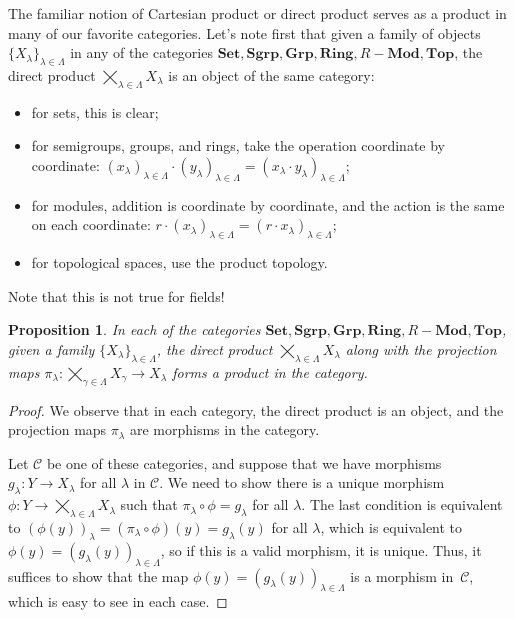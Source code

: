 \documentclass{amsart}[12pt]
\def\sC{\mathscr C}
\numberwithin{equation}{section}
\theoremstyle{plain} %
\newtheorem{prop}[equation]{Proposition}
\theoremstyle{definition}
\theoremstyle{remark}
\newcommand{\Set}{\mathbf{Set}}
\newcommand{\Grp}{\mathbf{Grp}}
\newcommand{\Sgrp}{\mathbf{Sgrp}}
\newcommand{\Ring}{\mathbf{Ring}}
\newcommand{\Mod}[1]{#1-\mathbf{Mod}}
\newcommand{\Top}{\mathbf{Top}}
\begin{document}
The familiar notion of Cartesian product or direct product serves as a product in many of our favorite categories. Let's note first that given a family of objects $\{X_\lambda\}_{\lambda\in \Lambda}$ in any of the categories $\Set,\Sgrp,\Grp,\Ring,\Mod{R},\Top$, the direct product $\bigtimes_{\lambda\in\Lambda} X_\lambda$ is an object of the same category:
\begin{itemize}
\item for sets, this is clear;
\item for semigroups, groups, and rings, take the operation coordinate by coordinate: $(x_{\lambda})_{\lambda\in \Lambda} \cdot (y_\lambda)_{\lambda\in \Lambda} = (x_\lambda \cdot y_\lambda)_{\lambda\in \Lambda}$;
\item for modules, addition is coordinate by coordinate, and the action is the same on each coordinate: $r\cdot (x_\lambda)_{\lambda\in \Lambda}=(r\cdot x_\lambda)_{\lambda\in \Lambda}$;
\item for topological spaces, use the product topology.
\end{itemize}
Note that this is not true for fields!

\begin{prop} In each of the categories $\Set,\Sgrp,\Grp,\Ring,\Mod{R}, \Top$, given a family $\{X_\lambda\}_{\lambda\in\Lambda}$, the direct product $\bigtimes_{\lambda\in\Lambda} X_\lambda$ along with the projection maps $\pi_{\lambda}:\bigtimes_{\gamma\in\Lambda} X_\gamma \to X_\lambda$ forms a product in the category.
\end{prop}
\begin{proof} We observe that in each category, the direct product is an object, and the projection maps $\pi_{\lambda}$ are morphisms in the category. 

Let $\sC$ be one of these categories, and suppose that we have morphisms $g_{\lambda}:Y \to X_\lambda$ for all $\lambda$ in $\sC$. We need to show there is a unique morphism $\phi:Y \to \bigtimes_{\lambda\in\Lambda} X_\lambda$ such that $\pi_\lambda \circ \phi = g_\lambda$ for all $\lambda$. The last condition
 is equivalent to $(\phi(y))_\lambda=(\pi_\lambda\circ\phi)(y) =g_\lambda(y)$ for all $\lambda$, which is equivalent to $\phi(y)=(g_\lambda(y))_{\lambda\in \Lambda}$, so if this is a valid morphism, it is unique.  Thus, it suffices to show that the map $\phi(y)=(g_\lambda(y))_{\lambda\in \Lambda}$ is a morphism in~$\sC$, which is easy to see in each case.
\end{proof}
\end{document}
